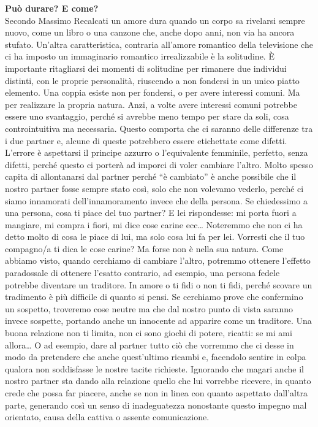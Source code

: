 \documentclass[12pt]{book} %
\begin{document}
\noindent \textbf{\large Può durare? E come?} \\
Secondo Massimo Recalcati un amore dura quando un corpo sa rivelarsi sempre nuovo, come un libro o una canzone che,
anche dopo anni, non via ha ancora stufato. Un'altra caratteristica, contraria
all'amore romantico della televisione che ci ha imposto un immaginario romantico irrealizzabile è
la solitudine. È importante ritagliarsi dei momenti di solitudine per rimanere due individui distinti, con le proprie
personalità, riuscendo a non fondersi in un unico piatto elemento. Una coppia esiste non per fondersi, o per avere
interessi comuni. Ma per realizzare la propria natura. Anzi, a volte avere interessi comuni potrebbe essere uno
svantaggio, perché si avrebbe meno tempo per stare da soli, cosa controintuitiva ma necessaria. Questo comporta che ci
saranno delle differenze tra i due partner e, alcune di queste potrebbero essere etichettate come difetti.
L'errore è aspettarsi il principe azzurro o l'equivalente femminile,
perfetto, senza difetti, perché questo ci porterà ad imporci di voler cambiare l'altro. Molto
spesso capita di allontanarsi dal partner perché “è cambiato” è anche possibile che il nostro partner fosse sempre stato così, solo che non
volevamo vederlo, perché ci siamo innamorati dell'innamoramento invece che della persona. Se
chiedessimo a una persona, cosa ti piace del tuo partner? E lei rispondesse: mi porta fuori a mangiare, mi compra i
fiori, mi dice cose carine ecc… Noteremmo che non ci ha detto molto di cosa le piace di lui, ma solo cosa lui fa per
lei. 
Vorresti che il tuo compagno/a ti dica le cose carine? Ma forse non è nella sua natura.
Come abbiamo visto, quando cerchiamo di cambiare l'altro, potremmo ottenere
l'effetto paradossale di ottenere l'esatto contrario, ad esempio, una persona
fedele potrebbe diventare un traditore. In amore o ti fidi o non ti fidi, perché scovare un tradimento è più difficile di
quanto si pensi. Se cerchiamo prove che confermino un sospetto, troveremo cose neutre ma che dal nostro punto di vista
saranno invece sospette, portando anche un innocente ad apparire come un traditore. Una buona relazione non ti limita,
non ci sono giochi di potere, ricatti: se mi ami allora… O ad esempio, dare al partner tutto ciò che vorremmo che
ci desse in modo da pretendere che anche quest'ultimo ricambi e, facendolo sentire in colpa
qualora non soddisfasse le nostre tacite richieste. Ignorando che magari anche il nostro partner sta dando alla
relazione quello che lui vorrebbe ricevere, in quanto crede che possa far piacere, anche se non in linea con quanto
aspettato dall'altra parte, generando così un senso di inadeguatezza nonostante questo impegno mal
orientato, causa della cattiva o assente comunicazione.
\end{document}
